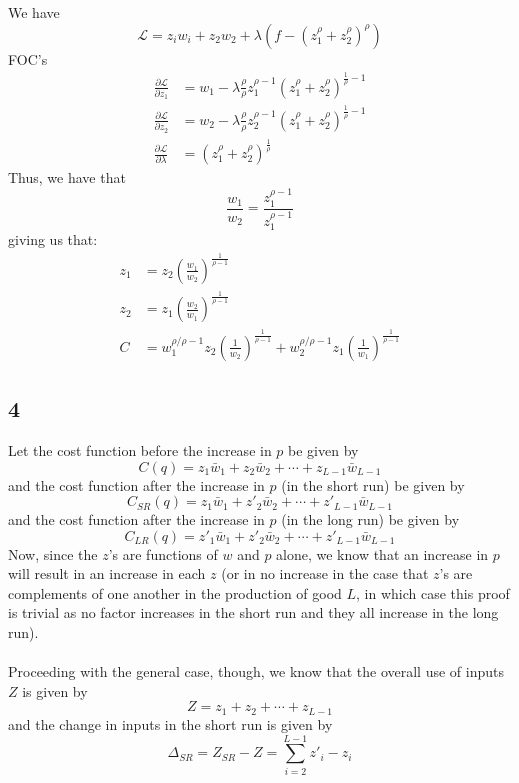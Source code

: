 \documentclass[letterpaper,12pt]{article}
\theoremstyle{definition}
\begin{document}
We have
\[ \mathscr{L} = z_iw_i + z_2w_2 + \lambda (f-(z_1^{\rho} + z_2^{\rho})^{\rho}) \]
FOC's
\begin{align*}
    \frac{\partial \mathscr{L} }{\partial z_1} &= w_1 - \lambda \frac{\rho}{\rho} z_1^{\rho -1}(z_1^{\rho} + z_2^{\rho})^{\frac{1}{\rho}-1} \\
    \frac{\partial \mathscr{L} }{\partial z_2} &= w_2 - \lambda \frac{\rho}{\rho} z_2^{\rho -1}(z_1^{\rho} + z_2^{\rho})^{\frac{1}{\rho}-1} \\
    \frac{\partial \mathscr{L} }{\partial \lambda} &= (z_1^{\rho} + z_2^{\rho})^{\frac{1}{\rho}}
\end{align*}
Thus, we have that
\[\frac{w_1}{w_2} = \frac{z_1^{\rho-1}}{z_1^{\rho-1}}\]
giving us that:
\begin{align*}
    z_1 &= z_2 \left( \frac{w_1}{w_2} \right)^{\frac{1}{\rho-1}} \\
    z_2 &= z_1 \left( \frac{w_2}{w_1} \right)^{\frac{1}{\rho-1}} \\
    C &= w_1^{\rho / \rho - 1}z_2 \left( \frac{1}{w_2} \right)^{\frac{1}{\rho-1}} + w_2^{\rho / \rho - 1}z_1 \left( \frac{1}{w_1} \right)^{\frac{1}{\rho-1}} 
\end{align*}

\subsection*{4}

Let the cost function before the increase in $p$ be given by
\[C(q) = z_1 \bar w_1 + z_2 \bar w_2 + \cdots + z_{L-1} \bar w_{L-1}\] 
and the cost function after the increase in $p$ (in the short run) be given by
\[C_{SR}(q) = z_1 \bar w_1 + z'_2 \bar w_2 + \cdots + z'_{L-1} \bar w_{L-1}\] 
and the cost function after the increase in $p$ (in the long run) be given by
\[C_{LR}(q) = z'_1 \bar w_1 + z'_2 \bar w_2 + \cdots + z'_{L-1} \bar w_{L-1}\] 
Now, since the $z$'s are functions of $w$ and $p$ alone, we know that an increase in $p$ will result in an increase in each $z$ (or in no increase in the case that $z$'s are complements of one another in the production of good $L$, in which case this proof is trivial as no factor increases in the short run and they all increase in the long run).\\\\
Proceeding with the general case, though, we know that the overall use of inputs $Z$ is given by
\[Z = z_1 + z_2 + \cdots + z_{L-1} \]
and the change in inputs in the short run is given by 
\[\Delta_{SR} = Z_{SR} - Z = \sum^{L-1}_{i=2} z'_i - z_i \]
\end{document}
